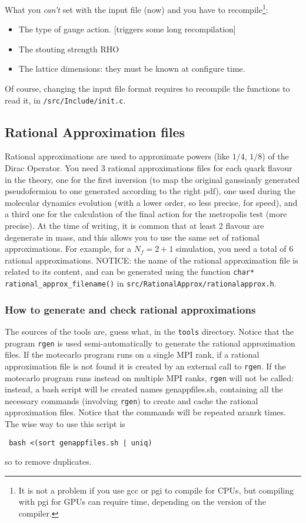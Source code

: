 What you \emph{can't} set with the input file (now) and you have to
recompile\footnote{ It is not a problem if you use gcc or pgi to compile for 
    CPUs, but compiling with pgi for GPUs can require time, depending on the
version of the compiler.}:
\begin{itemize}
    \item The type of gauge action. [triggers some long recompilation]
    \item The stouting strength RHO 
    \item The lattice dimensions: they must be known at {\sf configure} time.
\end{itemize}
Of course, changing the input file format requires to recompile the functions 
to read it, in \verb|/src/Include/init.c|.

\subsection{ Rational Approximation files}
Rational approximations are used to approximate powers (like $1/4$,
$1/8$) of the Dirac Operator.
You need $3$ rational approximations files for each quark flavour in the
theory, one for the first inversion (to map the original
gaussianly generated pseudofermion to one generated according to the
right pdf), one used during the molecular dynamics evolution (with a
lower order, so less precise, for speed), and a third one for the
calculation of the final action for the metropolis test (more
precise). At the time of writing, it is common that at least 2 flavour are 
degenerate in mass, and this allows you to use the same set of rational
approximations. For example, for a $N_f=2+1$ simulation, you need a total
of 6 rational approximations.
NOTICE: the name of the rational approximation file is related to
its content, and can be generated using the function
\verb|char* rational_approx_filename()| in
\verb|src/RationalApprox/rationalapprox.h|.

\subsubsection{ How to generate and check rational approximations}
The sources of the tools are, guess what, in  the \verb|tools| directory.
Notice that the program \verb|rgen| is used semi-automatically to generate the 
rational approximation files. If the motecarlo program runs on a single MPI rank, 
if a rational approximation file is not found it is created by an external call to \verb|rgen|.
If the motecarlo program runs instead on multiple MPI ranks, \verb|rgen| will not be called: 
instead, a bash script will be created names {\sf genappfiles.sh}, containing all the necessary commands (involving \verb|rgen|)
to create and cache the rational approximation files. Notice that the commands 
will be repeated {\sf nranrk} times. The wise way to use this script is 
\begin{verbatim}
 bash <(sort genappfiles.sh | uniq)
\end{verbatim}
so to remove duplicates.

